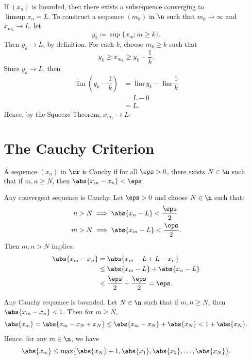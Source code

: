 

\begin{theorem}{
    If $(x_n)$ is bounded, then there exists a subsequence converging to $\limsup x_n = L$.
}
    To construct a sequence $(m_k)$ in $\n$ such that $m_k\to\infty$ and $x_{m_k}\to L$, let
    \[
        y_k \coloneqq \sup\{x_m : m\geq k\}.
    \]
    Then $y_k\to L$, by definition.
    For each $k$, choose $m_k\geq k$ such that
    \[
        y_k\geq x_{m_k}\geq y_k - \dfrac{1}{k}.
    \]
    Since $y_k\to L$, then
    \begin{align*}
        \lim\left(y_k - \dfrac{1}{k}\right) &= \lim y_k - \lim \dfrac{1}{k}\\
        &= L - 0\\
        &= L.
    \end{align*}
    Hence, by the Squeeze Theorem, $x_{m_k}\to L$.
\end{theorem}

\section{The Cauchy Criterion}

\begin{definition}
    A sequence $(x_n)$ in $\rr$ is Cauchy if for all $\eps > 0$, there exists $N\in\n$ such that if $m,n\geq N$, then $\abs{x_m - x_n} < \eps$.
\end{definition}

\begin{proposition}{
    Any convergent sequence is Cauchy.
}
    Let $\eps > 0$ and choose $N\in\n$ such that:
    \begin{align*}
        n > N&\implies \abs{x_n - L} < \dfrac{\eps}{2}\\
        m > N&\implies \abs{x_m - L} < \dfrac{\eps}{2}.
    \end{align*}
    Then $m,n > N$ implies:
    \begin{align*}
        \abs{x_m - x_n} &= \abs{x_m - L + L - x_n}\\
        &\leq \abs{x_m - L} + \abs{x_n - L}\\
        &< \dfrac{\eps}{2} + \dfrac{\eps}{2} = \eps.
    \end{align*}
\end{proposition}

\begin{lemma}{
    Any Cauchy sequence is bounded.
}
    Let $N\in\n$ such that if $m,n \geq N$, then $\abs{x_m - x_n}<1$.
    Then for $m\geq N$,
    \[
        \abs{x_m} = \abs{x_m - x_N + x_N} \leq \abs{x_m - x_N} + \abs{x_N} < 1 + \abs{x_N}.
    \]
    Hence, for any $m\in\n$, we have
    \[
        \abs{x_m} \leq\max\{\abs{x_N} + 1, \abs{x_1},\abs{x_2}, \ldots, \abs{x_N}\}.
    \]
\end{lemma}

